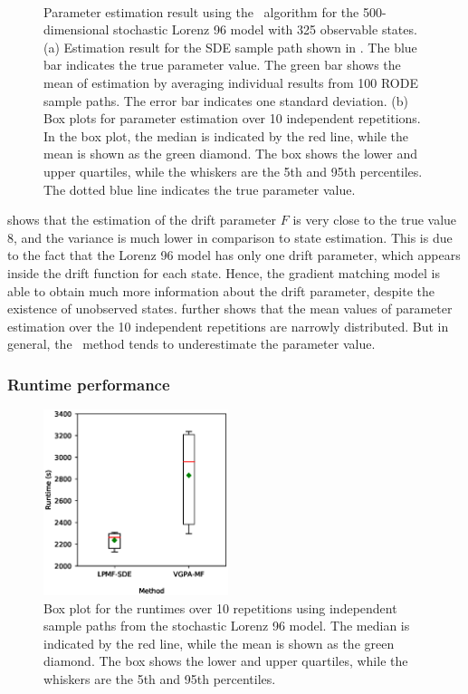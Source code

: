\begin{figure}
\begin{subfigure}[b]{0.48\textwidth}
        \caption{\ }
        \label{fig-lorenz-96-parameters-boxplot}
    \end{subfigure}
    \caption{Parameter estimation result using the \algolpmfsde\ algorithm for the 500-dimensional stochastic Lorenz 96 model with 325 observable states. (a) Estimation result for the SDE sample path shown in . The blue bar indicates the true parameter value. The green bar shows the mean of estimation by averaging individual results from 100 RODE sample paths. The error bar indicates one standard deviation. (b) Box plots for parameter estimation over 10 independent repetitions. In the box plot, the median is indicated by the red line, while the mean is shown as the green diamond. The box shows the lower and upper quartiles, while the whiskers are the 5th and 95th percentiles. The dotted blue line indicates the true parameter value.}
    \label{fig-lorenz-96-parameters-group}    
\end{figure}

 shows that the estimation of the drift parameter $F$ is very close to the true value 8, and the variance is much lower in comparison to state estimation.
This is due to the fact that the Lorenz 96 model has only one drift parameter, which appears inside the drift function for each state.
Hence, the gradient matching model is able to obtain much more information about the drift parameter, despite the existence of unobserved states.
 further shows that the mean values of parameter estimation over the 10 independent repetitions are narrowly distributed.
But in general, the \algolpmfsde\ method tends to underestimate the parameter value.

\subsubsection*{Runtime performance}

\begin{figure}
    \centering
    \includegraphics[width=0.48\textwidth]{graphics/lorenz-96-runtime-boxplot}
    \caption{Box plot for the runtimes over 10 repetitions using independent sample paths from the stochastic Lorenz 96 model. The median is indicated by the red line, while the mean is shown as the green diamond. The box shows the lower and upper quartiles, while the whiskers are the 5th and 95th percentiles.}        
    \label{fig-lorenz-96-runtime-boxplot}
\end{figure}

